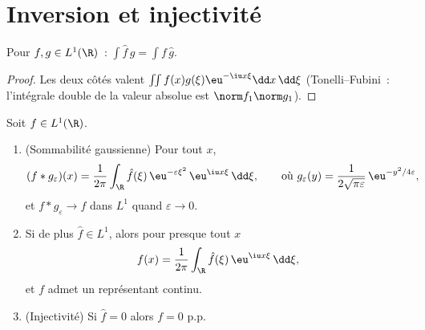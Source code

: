 \section{Inversion et injectivité}

\begin{lemma}
\label{lem:b3:fouriertransform:multiplication}
Pour $f, g \in L^1(\R)$~: $\displaystyle\int \hat f\,g =
\int f\,\hat g$.
\end{lemma}

\begin{proof}
Les deux côtés valent $\iint f(x)g(\xi)\eu^{-\iu x\xi}\dd
x\,\dd\xi$ (Tonelli--Fubini~: l'intégrale double de la valeur
absolue est $\norm f_1\norm g_1$).
\end{proof}

\begin{theorem}[Inversion]\label{thm:b3:fouriertransform:inversion}
Soit $f \in L^1(\R)$.
\begin{enumerate}
  \item (Sommabilité gaussienne) Pour tout $x$,
        \[
        (f * g_\varepsilon)(x) =
        \frac1{2\pi}\int_\R \hat f(\xi)\,
        \eu^{-\varepsilon\xi^2}\,\eu^{\iu x\xi}\,\dd\xi,
        \qquad\text{où } g_\varepsilon(y) =
        \frac{1}{2\sqrt{\pi\varepsilon}}\,
        \eu^{-y^2/4\varepsilon},
        \]
        et $f * g_\varepsilon \to f$ dans $L^1$ quand
        $\varepsilon \to 0$.
  \item Si de plus $\hat f \in L^1$, alors pour presque tout
        $x$
        \[
        f(x) = \frac{1}{2\pi}\int_\R \hat
        f(\xi)\,\eu^{\iu x\xi}\,\dd\xi ,
        \]
        et $f$ admet un représentant continu.
  \item (Injectivité) Si $\hat f = 0$ alors $f = 0$ p.p.
\end{enumerate}
\end{theorem}

